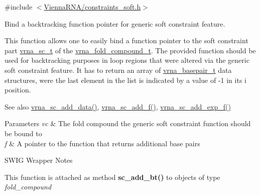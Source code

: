 {\ttfamily \#include $<$\hyperlink{constraints__soft_8h}{Vienna\+R\+N\+A/constraints\+\_\+soft.\+h}$>$}



Bind a backtracking function pointer for generic soft constraint feature. 

This function allows one to easily bind a function pointer to the soft constraint part \hyperlink{group__soft__constraints_ga75401ce219ef8dbcceb672db82d434c6}{vrna\+\_\+sc\+\_\+t} of the \hyperlink{group__fold__compound_ga1b0cef17fd40466cef5968eaeeff6166}{vrna\+\_\+fold\+\_\+compound\+\_\+t}. The provided function should be used for backtracking purposes in loop regions that were altered via the generic soft constraint feature. It has to return an array of \hyperlink{group__data__structures_gac8c5669d3fb813cacf506489689305ce}{vrna\+\_\+basepair\+\_\+t} data structures, were the last element in the list is indicated by a value of -\/1 in it\textquotesingle{}s i position.

\begin{DoxySeeAlso}{See also}
\hyperlink{group__soft__constraints_ga15c6d52471ec97897e2bb7f964f5deb6}{vrna\+\_\+sc\+\_\+add\+\_\+data()}, \hyperlink{group__soft__constraints_ga8c7d907ec0125cd61c04e0908010a4e9}{vrna\+\_\+sc\+\_\+add\+\_\+f()}, \hyperlink{group__soft__constraints_ga87e382b5d0c9b7d9ce1b79c0473ff700}{vrna\+\_\+sc\+\_\+add\+\_\+exp\+\_\+f()}
\end{DoxySeeAlso}

\begin{DoxyParams}{Parameters}
{\em vc} & The fold compound the generic soft constraint function should be bound to \\
\hline
{\em f} & A pointer to the function that returns additional base pairs\\
\hline
\end{DoxyParams}
\begin{DoxyRefDesc}{S\+W\+I\+G Wrapper Notes}
\item[\hyperlink{wrappers__wrappers000021}{S\+W\+I\+G Wrapper Notes}]This function is attached as method {\bfseries sc\+\_\+add\+\_\+bt()} to objects of type {\itshape fold\+\_\+compound} \end{DoxyRefDesc}
